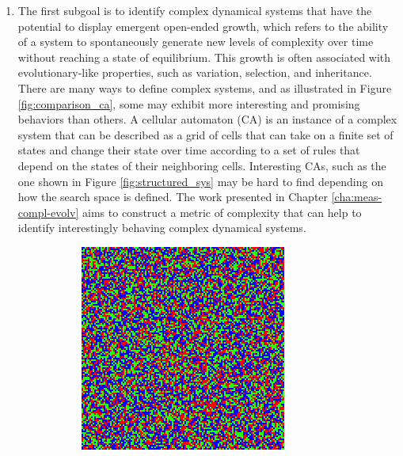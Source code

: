 \begin{enumerate}
  \item The first subgoal is to identify complex dynamical systems that have the 
  potential to display emergent open-ended growth, which refers to the ability of 
  a system to spontaneously generate new levels of complexity over time without 
  reaching a state of equilibrium. This growth is often associated with 
  evolutionary-like properties, such as variation, selection, and inheritance.
  There are many ways to define complex systems, and as
        illustrated in Figure \ref{fig:comparison_ca}, some may exhibit more
        interesting and promising behaviors than others. A cellular automaton (CA) 
        is an instance of a complex system that can be described as a grid of cells that can 
        take on a finite set of states and change their state over time according to a set 
        of rules that depend on the states of their neighboring cells. Interesting \acp{CA}, such 
        as the one shown in Figure \ref{fig:structured_sys}
        may be hard to find depending on how the
        search space is defined. The work presented in Chapter
        \ref{cha:meas-compl-evolv} aims to construct a metric of complexity
        that can help to identify interestingly behaving complex
        dynamical systems.
\begin{figure}[htbp]
  \centering
\begin{subfigure}[t]{.4\linewidth}
  \centering
  \includegraphics[width=\linewidth]{figures/disord2.png}

\end{subfigure}
\end{figure}
\end{enumerate}
